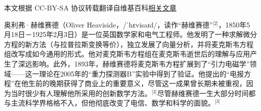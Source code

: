 
本文根据 CC-BY-SA 协议转载翻译自维基百科\href{https://en.wikipedia.org/wiki/Oliver_Heaviside}{相关文章}

奥利弗·赫维赛德（Oliver Heaviside，/ˈhɛvisaɪd/，读作“赫维赛德”\(^\text{[2]}\)，1850年5月18日－1925年2月3日）是一位英国数学家和电气工程师。他发明了一种求解微分方程的新方法（与拉普拉斯变换等价），独立发展了向量分析，并将麦克斯韦方程组改写成如今通用的形式。他对麦克斯韦方程组在麦克斯韦逝世后的理解与应用产生了深远影响。此外，1893年，赫维赛德将麦克斯韦方程扩展到了“引力电磁学”领域——这一理论在2005年的“重力探测器B”实验中得到了验证。他提出的“电报方程”在他生前的晚期获得了商业上的重要意义，尽管这一成果曾长期未被重视，因为当时很少有人理解他所采用的创新数学方法。\(^\text{[3]}\)尽管赫维赛德一生大部分时间都与主流科学界格格不入，但他彻底改变了电信、数学和科学的面貌。\(^\text{[3]}\)
